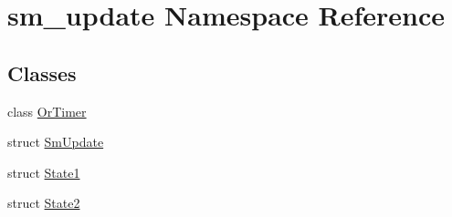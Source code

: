 \hypertarget{namespacesm__update}{}\section{sm\+\_\+update Namespace Reference}
\label{namespacesm__update}
\subsection*{Classes}
\begin{DoxyCompactItemize}
\item 
class \hyperlink{classsm__update_1_1OrTimer}{Or\+Timer}
\item 
struct \hyperlink{structsm__update_1_1SmUpdate}{Sm\+Update}
\item 
struct \hyperlink{structsm__update_1_1State1}{State1}
\item 
struct \hyperlink{structsm__update_1_1State2}{State2}
\end{DoxyCompactItemize}
